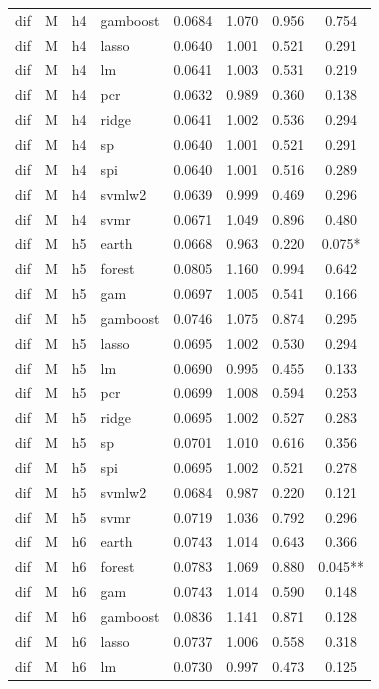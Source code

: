 \begin{ThreePartTable}
\begin{longtable}[t]{llclcccc}
dif & M & h4 & gamboost & 0.0684 & 1.070 & 0.956 & 0.754\\
dif & M & h4 & lasso & 0.0640 & 1.001 & 0.521 & 0.291\\
dif & M & h4 & lm & 0.0641 & 1.003 & 0.531 & 0.219\\
dif & M & h4 & pcr & 0.0632 & 0.989 & 0.360 & 0.138\\
dif & M & h4 & ridge & 0.0641 & 1.002 & 0.536 & 0.294\\
dif & M & h4 & sp & 0.0640 & 1.001 & 0.521 & 0.291\\
dif & M & h4 & spi & 0.0640 & 1.001 & 0.516 & 0.289\\
dif & M & h4 & svmlw2 & 0.0639 & 0.999 & 0.469 & 0.296\\
dif & M & h4 & svmr & 0.0671 & 1.049 & 0.896 & 0.480\\
\addlinespace
dif & M & h5 & earth & 0.0668 & 0.963 & 0.220 & 0.075*\\
dif & M & h5 & forest & 0.0805 & 1.160 & 0.994 & 0.642\\
dif & M & h5 & gam & 0.0697 & 1.005 & 0.541 & 0.166\\
dif & M & h5 & gamboost & 0.0746 & 1.075 & 0.874 & 0.295\\
dif & M & h5 & lasso & 0.0695 & 1.002 & 0.530 & 0.294\\
dif & M & h5 & lm & 0.0690 & 0.995 & 0.455 & 0.133\\
dif & M & h5 & pcr & 0.0699 & 1.008 & 0.594 & 0.253\\
dif & M & h5 & ridge & 0.0695 & 1.002 & 0.527 & 0.283\\
dif & M & h5 & sp & 0.0701 & 1.010 & 0.616 & 0.356\\
dif & M & h5 & spi & 0.0695 & 1.002 & 0.521 & 0.278\\
dif & M & h5 & svmlw2 & 0.0684 & 0.987 & 0.220 & 0.121\\
dif & M & h5 & svmr & 0.0719 & 1.036 & 0.792 & 0.296\\
\addlinespace
dif & M & h6 & earth & 0.0743 & 1.014 & 0.643 & 0.366\\
dif & M & h6 & forest & 0.0783 & 1.069 & 0.880 & 0.045**\\
dif & M & h6 & gam & 0.0743 & 1.014 & 0.590 & 0.148\\
dif & M & h6 & gamboost & 0.0836 & 1.141 & 0.871 & 0.128\\
dif & M & h6 & lasso & 0.0737 & 1.006 & 0.558 & 0.318\\
dif & M & h6 & lm & 0.0730 & 0.997 & 0.473 & 0.125\\

\end{longtable}
\end{ThreePartTable}
